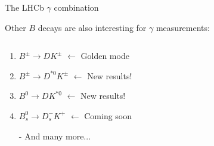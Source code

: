 \documentclass[dvipsnames]{beamer}
\begin{document}
\begin{frame}{The LHCb $\gamma$ combination}
  \begin{center}
    \Large Other $B$ decays are also interesting for $\gamma$ measurements:
  \end{center}
  \vspace{0.2cm}
  \begin{columns}
    \begin{column}{0.6\textwidth}
      \vspace{1.5cm}
      \begin{enumerate}
        \item{$B^\pm\to DK^\pm$ $\leftarrow$ Golden mode}
        \item{$B^\pm\to D^{*0}K^\pm$ $\leftarrow$ New results!}
        \item{$B^0\to DK^{*0}$ $\leftarrow$ New results!}
        \item{$B_s^0\to D_s^-K^+$ $\leftarrow$ Coming soon}
        \item[-]{And many more...}
      \end{enumerate}
      \vspace{1.5cm}
    \end{column}
    \begin{column}{0.4\textwidth}
    \end{column}
  \end{columns}
\end{frame}
\end{document}

